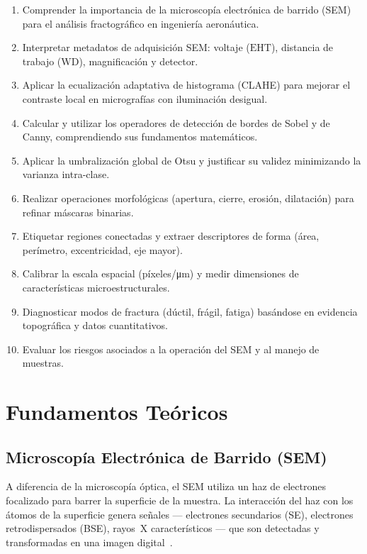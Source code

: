 \documentclass[12pt,a4paper]{article}
\begin{document}
\begin{enumerate}
	\item Comprender la importancia de la microscopía electrónica de barrido
	      (SEM) para el análisis fractográfico en ingeniería aeronáutica.
	\item Interpretar metadatos de adquisición SEM: voltaje ($\mathrm{EHT}$),
	      distancia de trabajo ($\mathrm{WD}$), magnificación y detector.
	\item Aplicar la ecualización adaptativa de histograma (CLAHE) para
	      mejorar el contraste local en micrografías con iluminación desigual.
	\item Calcular y utilizar los operadores de detección de bordes de Sobel
	      y de Canny, comprendiendo sus fundamentos matemáticos.
	\item Aplicar la umbralización global de Otsu y justificar su validez
	      minimizando la varianza intra-clase.
	\item Realizar operaciones morfológicas (apertura, cierre, erosión,
	      dilatación) para refinar máscaras binarias.
	\item Etiquetar regiones conectadas y extraer descriptores de forma
	      (área, perímetro, excentricidad, eje mayor).
	\item Calibrar la escala espacial (píxeles/\si{\micro\m}) y medir
	      dimensiones de características microestructurales.
	\item Diagnosticar modos de fractura (dúctil, frágil, fatiga) basándose
	      en evidencia topográfica y datos cuantitativos.
	\item Evaluar los riesgos asociados a la operación del SEM y al manejo
	      de muestras.
\end{enumerate}

\section{Fundamentos Teóricos}
\label{sec:teoria}

\subsection{Microscopía Electrónica de Barrido (SEM)}

A diferencia de la microscopía óptica, el SEM utiliza un haz de electrones
focalizado para barrer la superficie de la muestra.  La interacción del haz
con los átomos de la superficie genera señales --- electrones secundarios
(SE), electrones retrodispersados (BSE), rayos~X característicos --- que
son detectadas y transformadas en una imagen
digital~\cite{goldstein2018}.
\end{document}
